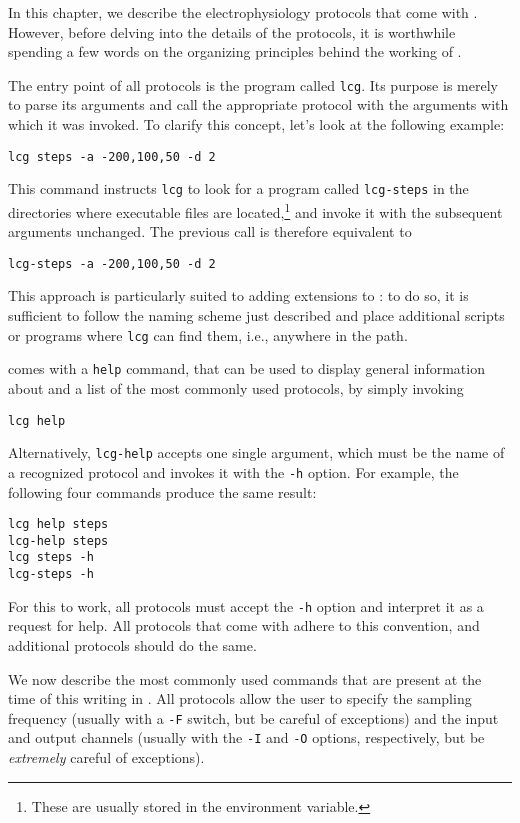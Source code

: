 In this chapter, we describe the electrophysiology protocols that come
with \progname. However, before delving into the details of the
protocols, it is worthwhile spending a few words on the organizing
principles behind the working of \progname.

The entry point of all \progname protocols is the program called
\verb+lcg+. Its purpose is merely to parse its arguments and
call the appropriate protocol with the arguments with which it was
invoked. To clarify this concept, let's look at the following example:
\begin{lstlisting}
lcg steps -a -200,100,50 -d 2
\end{lstlisting}
This command instructs \verb+lcg+ to look for a program called
\verb+lcg-steps+ in the directories where executable files are
located,\footnote{These are usually stored in the 
environment variable.} and invoke it with the subsequent arguments
unchanged. The previous call is therefore equivalent to
\begin{lstlisting}
lcg-steps -a -200,100,50 -d 2
\end{lstlisting}
This approach is particularly suited to adding extensions to
\progname: to do so, it is sufficient to follow the naming scheme just
described and place additional scripts or programs where
\verb+lcg+ can find them, i.e., anywhere in the path.
 
\progname comes with a \verb+help+ command, that can be used to
display general information about \progname and a list of the most
commonly used protocols, by simply invoking
\begin{lstlisting}
lcg help
\end{lstlisting}
Alternatively, \verb+lcg-help+ accepts one single argument,
which must be the name of a recognized protocol and invokes it with
the \verb+-h+ option. For example, the following four commands
produce the same result:
\begin{lstlisting}
lcg help steps
lcg-help steps
lcg steps -h
lcg-steps -h
\end{lstlisting}
For this to work, all protocols must accept the \verb+-h+ option
and interpret it as a request for help. All protocols that come with
\progname adhere to this convention, and additional protocols should
do the same.

We now describe the most commonly used commands that are present at
the time of this writing in \progname. All protocols allow the user to
specify the sampling frequency (usually with a \verb+-F+ switch,
but be careful of exceptions) and the input and output channels
(usually with the \verb+-I+ and \verb+-O+ options, respectively,
but be \emph{extremely} careful of exceptions).

